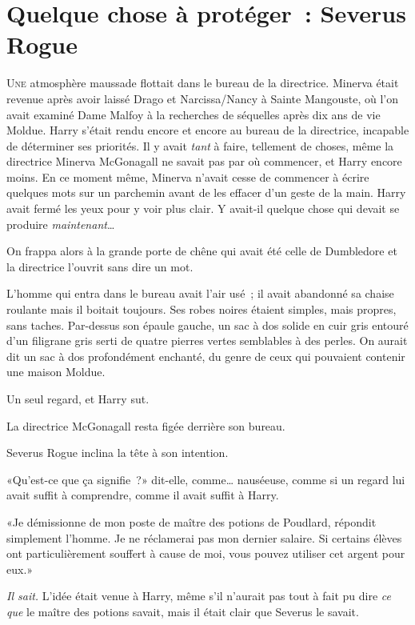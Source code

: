 \chapter{Quelque chose à protéger~: Severus Rogue}

\lettrine{U}{ne} atmosphère maussade flottait dans le bureau de la directrice. Minerva était revenue après avoir laissé Drago et Narcissa/Nancy à Sainte Mangouste, où l'on avait examiné Dame Malfoy à la recherches de séquelles après dix ans de vie Moldue. Harry s'était rendu encore et encore au bureau de la directrice, incapable de déterminer ses priorités. Il y avait \emph{tant} à faire, tellement de choses, même la directrice Minerva McGonagall ne savait pas par où commencer, et Harry encore moins. En ce moment même, Minerva n'avait cesse de commencer à écrire quelques mots sur un parchemin avant de les effacer d'un geste de la main. Harry avait fermé les yeux pour y voir plus clair. Y avait-il quelque chose qui devait se produire \emph{maintenant}…

On frappa alors à la grande porte de chêne qui avait été celle de Dumbledore et la directrice l'ouvrit sans dire un mot.

L'homme qui entra dans le bureau avait l'air usé~; il avait abandonné sa chaise roulante mais il boitait toujours. Ses robes noires étaient simples, mais propres, sans taches. Par-dessus son épaule gauche, un sac à dos solide en cuir gris entouré d'un filigrane gris serti de quatre pierres vertes semblables à des perles. On aurait dit un sac à dos profondément enchanté, du genre de ceux qui pouvaient contenir une maison Moldue.

Un seul regard, et Harry sut.

La directrice McGonagall resta figée derrière son bureau.

Severus Rogue inclina la tête à son intention.

«Qu'est-ce que ça signifie~?» dit-elle, comme… nauséeuse, comme si un regard lui avait suffit à comprendre, comme il avait suffit à Harry.

«Je démissionne de mon poste de maître des potions de Poudlard, répondit simplement l'homme. Je ne réclamerai pas mon dernier salaire. Si certains élèves ont particulièrement souffert à cause de moi, vous pouvez utiliser cet argent pour eux.»

\emph{Il sait.} L'idée était venue à Harry, même s'il n'aurait pas tout à fait pu dire \emph{ce que} le maître des potions savait, mais il était clair que Severus le savait.

